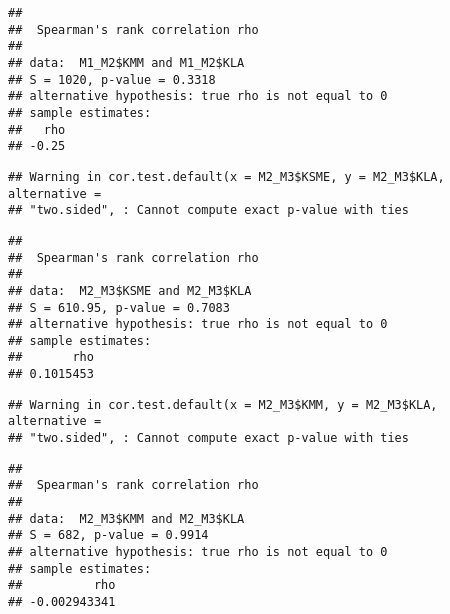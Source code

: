 \documentclass[]{article}
\newenvironment{Shaded}{\begin{snugshade}}{\end{snugshade}}
\newcommand{\KeywordTok}[1]{\textcolor[rgb]{0.13,0.29,0.53}{\textbf{{#1}}}}
\newcommand{\DataTypeTok}[1]{\textcolor[rgb]{0.13,0.29,0.53}{{#1}}}
\newcommand{\StringTok}[1]{\textcolor[rgb]{0.31,0.60,0.02}{{#1}}}
\newcommand{\CommentTok}[1]{\textcolor[rgb]{0.56,0.35,0.01}{\textit{{#1}}}}
\newcommand{\OtherTok}[1]{\textcolor[rgb]{0.56,0.35,0.01}{{#1}}}
\newcommand{\NormalTok}[1]{{#1}}
\begin{document}
\begin{verbatim}
## 
##  Spearman's rank correlation rho
## 
## data:  M1_M2$KMM and M1_M2$KLA
## S = 1020, p-value = 0.3318
## alternative hypothesis: true rho is not equal to 0
## sample estimates:
##   rho 
## -0.25
\end{verbatim}

\begin{Shaded}
\end{Shaded}

\begin{verbatim}
## Warning in cor.test.default(x = M2_M3$KSME, y = M2_M3$KLA, alternative =
## "two.sided", : Cannot compute exact p-value with ties
\end{verbatim}

\begin{verbatim}
## 
##  Spearman's rank correlation rho
## 
## data:  M2_M3$KSME and M2_M3$KLA
## S = 610.95, p-value = 0.7083
## alternative hypothesis: true rho is not equal to 0
## sample estimates:
##       rho 
## 0.1015453
\end{verbatim}

\begin{Shaded}
\end{Shaded}

\begin{verbatim}
## Warning in cor.test.default(x = M2_M3$KMM, y = M2_M3$KLA, alternative =
## "two.sided", : Cannot compute exact p-value with ties
\end{verbatim}

\begin{verbatim}
## 
##  Spearman's rank correlation rho
## 
## data:  M2_M3$KMM and M2_M3$KLA
## S = 682, p-value = 0.9914
## alternative hypothesis: true rho is not equal to 0
## sample estimates:
##          rho 
## -0.002943341
\end{verbatim}
\end{document}
